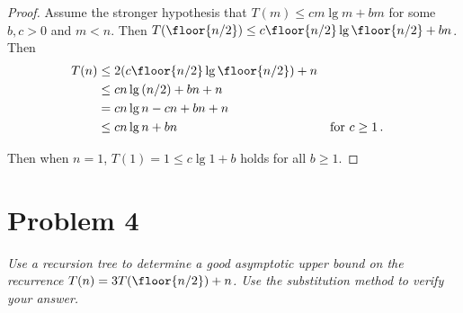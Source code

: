 \documentclass{abrice}
\begin{document}
\begin{proof}
  Assume the stronger hypothesis that $T(m) \leq c m \lg m + bm$ for some
  $b,c > 0$ and $m < n$. Then
  $T(\floor{n/2}) \leq c \floor{n/2} \lg{\floor{n/2}} + bn$. Then
  \begin{align*}
    T(n) &\leq 2(c \floor{n/2} \lg\floor{n/2}) + n \\
    &\leq cn \lg{(n/2)} + bn + n \\
    &= cn \lg n - cn + bn + n \\
    &\leq cn \lg n + bn && \text{for } c \geq 1 \, .
  \end{align*}

  Then when $n = 1$, $T(1) = 1 \leq c \lg 1 + b$ holds for all $b \geq 1$.
\end{proof}

\section{Problem 4}
\emph{Use a recursion tree to determine a good asymptotic upper bound on the
  recurrence $T(n) = 3T(\floor{n/2}) + n$. Use the substitution method to verify
  your answer.}
\medskip
\end{document}
